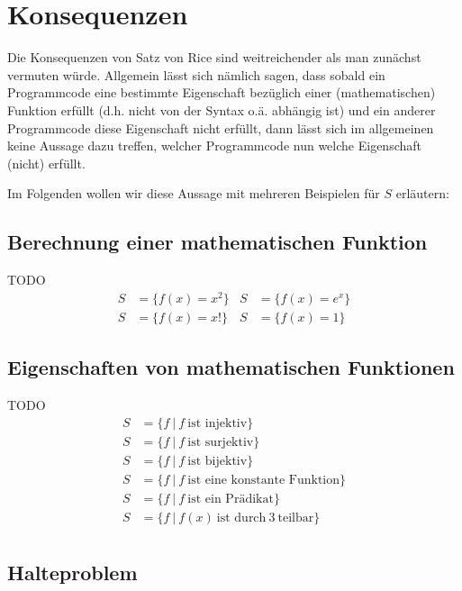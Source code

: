 \documentclass[journal]{IEEEtran}
\begin{document}
\section{Konsequenzen}
\label{konsequenzen}

Die Konsequenzen von Satz von Rice sind weitreichender als man zunächst vermuten würde. Allgemein lässt sich nämlich sagen, dass sobald ein Programmcode eine bestimmte Eigenschaft bezüglich einer (mathematischen) Funktion erfüllt (d.h. nicht von der Syntax o.ä. abhängig ist) und ein anderer Programmcode diese Eigenschaft nicht erfüllt, dann lässt sich im allgemeinen keine Aussage dazu treffen, welcher Programmcode nun welche Eigenschaft (nicht) erfüllt.

Im Folgenden wollen wir diese Aussage mit mehreren Beispielen für $S$ erläutern:

\subsection{Berechnung einer mathematischen Funktion}

TODO
\begin{align*}
S &= \{f(x) = x^2 \} &S &= \{ f(x) = e^x \} \\
S &= \{f(x) = x! \}  &S &= \{ f(x) = 1 \}
\end{align*}

\subsection{Eigenschaften von mathematischen Funktionen}

TODO
\begin{align*}
S &= \{ f \ \vert \ f \ \text{ist injektiv} \} \\
S &= \{ f \ \vert \ f \ \text{ist surjektiv} \} \\
S &= \{ f \ \vert \ f \ \text{ist bijektiv} \} \\
S &= \{ f \ \vert \ f \ \text{ist eine konstante Funktion} \} \\
S &= \{ f \ \vert \ f \ \text{ist ein Prädikat} \} \\
S &= \{ f \ \vert \ f(x) \ \text{ist durch} \ 3 \ \text{teilbar} \} \\
\end{align*}

\subsection{Halteproblem}
\end{document}
